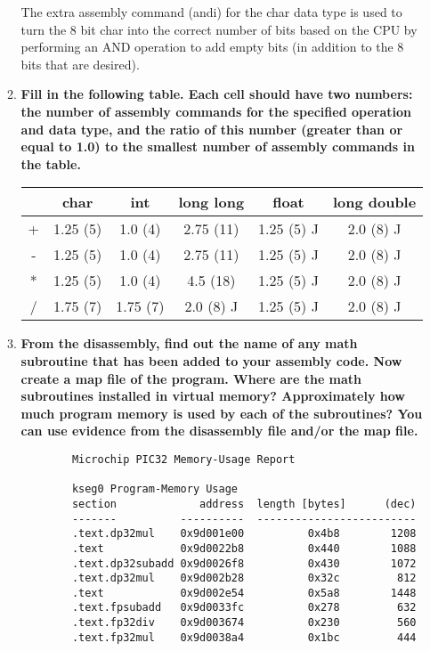 \documentclass{article}
\begin{document}
\begin{enumerate}[label=\textbf{\arabic*})]
\begin{enumerate}[label=\textbf{\alph*}.]
        The extra assembly command (andi) for the char data type is used to turn the 8 bit char into 
        the correct number of bits based on the CPU by performing an AND operation to add empty bits
        (in addition to the 8 bits that are desired).

        \item \textbf{Fill in the following table. Each cell should have two numbers: the number of
        assembly commands for the specified operation and data type, and the ratio of this
        number (greater than or equal to 1.0) to the smallest number of assembly commands
        in the table.} \\

        \begin{center}
            \begin{tabular}{ c | c | c | c | c | c }
              & char & int & long long & float & long double \\ 
             \hline
            + & 1.25 (5) & 1.0 (4) & 2.75 (11) & 1.25 (5) J & 2.0 (8) J \\  
            - & 1.25 (5) & 1.0 (4) & 2.75 (11) & 1.25 (5) J & 2.0 (8) J \\  
            * & 1.25 (5) & 1.0 (4) & 4.5 (18) & 1.25 (5) J & 2.0 (8) J \\ 
            / & 1.75 (7) & 1.75 (7) & 2.0 (8) J & 1.25 (5) J & 2.0 (8) J \\            
            \end{tabular}
        \end{center}
        \pagebreak
        \item \textbf{From the disassembly, find out the name of any math subroutine that has been added
        to your assembly code. Now create a map file of the program. Where are the math
        subroutines installed in virtual memory? Approximately how much program
        memory is used by each of the subroutines? You can use evidence from the
        disassembly file and/or the map file.} \\

        \begin{verbatim}
        Microchip PIC32 Memory-Usage Report

        kseg0 Program-Memory Usage
        section             address  length [bytes]      (dec)
        -------          ----------  -------------------------
        .text.dp32mul    0x9d001e00          0x4b8        1208   
        .text            0x9d0022b8          0x440        1088
        .text.dp32subadd 0x9d0026f8          0x430        1072   
        .text.dp32mul    0x9d002b28          0x32c         812   
        .text            0x9d002e54          0x5a8        1448
        .text.fpsubadd   0x9d0033fc          0x278         632   
        .text.fp32div    0x9d003674          0x230         560   
        .text.fp32mul    0x9d0038a4          0x1bc         444   
        \end{verbatim}
    \end{enumerate}


\end{enumerate}
\end{document}
